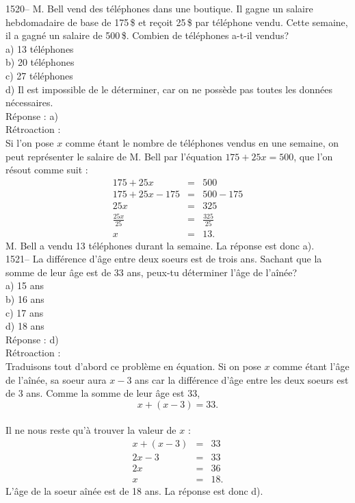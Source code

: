 1520-- M. Bell vend des t\'el\'ephones dans une boutique. Il gagne un
salaire hebdomadaire de base de 175\,\$ et re\c coit 25\,\$ par
t\'el\'ephone vendu. Cette semaine, il a gagn\'e un salaire de
500\,\$. Combien de t\'el\'ephones a-t-il vendus?\\
a) 13 t\'el\'ephones\\
b) 20 t\'el\'ephones\\
c) 27 t\'el\'ephones\\
d) Il est impossible de le d\'eterminer, car on ne poss\`ede pas toutes les
donn\'ees n\'ecessaires.\\

R\'eponse : a)\\

R\'etroaction :\\
Si l'on pose $x$ comme \'etant le nombre de t\'el\'ephones vendus en
une semaine, on peut repr\'esenter le salaire de M. Bell par
l'\'equation $175+25x=500$, que l'on r\'esout comme suit :
\begin{eqnarray*}
175+25x&=&500 \\ 175+25x-175&=&500-175 \\25x&=&325 \\[3mm]
\frac{25x}{25}&=&\frac{325}{25}\\[3mm]
x&=&13.
\end{eqnarray*}
M. Bell a vendu 13 t\'el\'ephones durant la semaine. La r\'eponse est donc
a).\\

1521-- La diff\'erence d'\^age entre deux soeurs est de trois ans.
Sachant que la somme de leur \^age est de 33 ans, peux-tu
d\'eterminer l'\^age de
l'a\^in\'ee?\\
a) 15 ans\\
b) 16 ans\\
c) 17 ans\\
d) 18 ans\\

R\'eponse : d)\\

R\'etroaction  :\\
Traduisons tout d'abord ce probl\`eme en \'equation. Si on pose $x$
comme \'etant l'\^age de l'a\^in\'ee, sa soeur aura $x-3$ ans car la
diff\'erence d'\^age entre les deux soeurs est de 3 ans. Comme la
somme de leur \^age est 33, $$x+(x-3)=33.$$\\ Il ne nous reste
qu'\`a trouver la valeur de $x$ :
\begin{eqnarray*}
x+(x-3)&=&33 \\ 2x-3 &=&33 \\ 2x &=& 36 \\ x&=&18.
\end{eqnarray*}
L'\^age de la soeur a\^in\'ee est de 18 ans. La r\'eponse est donc d).\\

